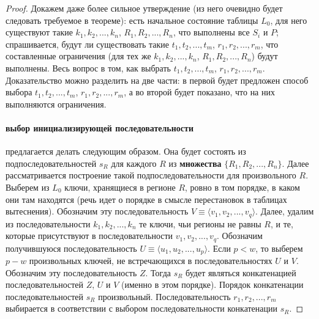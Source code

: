 \begin{proof}
Докажем даже более сильное утверждение (из него очевидно будет следовать требуемое в теореме): есть начальное состояние таблицы $L_0$, для него существуют такие $k_1, k_2, ..., k_n$, $R_1, R_2, ..., R_n$, что выполнены все $S_i$ и $P$; спрашивается, будут ли существовать такие $t_1, t_2, ..., t_m$, $r_1, r_2, ..., r_m$, что составленные ограничения (для тех же $k_1, k_2, ..., k_n$, $R_1, R_2, ..., R_n$) будут выполнены. Весь вопрос в том, как выбрать $t_1, t_2, ..., t_m$, $r_1, r_2, ..., r_m$. Доказательство можно разделить на две части: в первой будет предложен способ выбора $t_1, t_2, ..., t_m$, $r_1, r_2, ..., r_m$, а во второй будет показано, что на них выполняются ограничения.

\paragraph{выбор инициализирующей последовательности} предлагается делать следующим образом. Она будет состоять из подпоследовательностей $s_R$ для каждого $R$ из \textbf{множества} $\{R_1, R_2, ..., R_n\}$. Далее рассматривается построение такой подпоследовательности для произвольного $R$. Выберем из $L_0$ ключи, хранящиеся в регионе $R$, ровно в том порядке, в каком они там находятся (речь идет о порядке в смысле перестановок в таблицах вытеснения). Обозначим эту последовательность $V \equiv \langle v_1, v_2, ..., v_q \rangle$. Далее, удалим из последовательности $k_1, k_2, ..., k_n$ те ключи, чьи регионы не равны $R$, и те, которые присутствуют в последовательности $v_1, v_2, ..., v_q$. Обозначим получившуюся последовательность $U \equiv \langle u_1, u_2, ..., u_p\rangle$. Если $p < w$, то выберем $p{-}w$ произвольных ключей, не встречающихся в последовательностях $U$ и $V$. Обозначим эту последовательность $Z$. Тогда $s_R$ будет являться конкатенацией последовательностей $Z$, $U$ и $V$ (именно в этом порядке). Порядок конкатенации последовательностей $s_R$ произвольный. Последовательность $r_1, r_2, ..., r_m$ выбирается в соответствии с выбором последовательности конкатенации $s_R$.


\end{proof}
